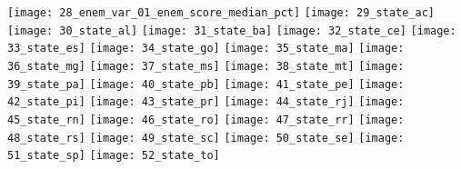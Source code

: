 \texttt{[image: 28\_enem\_var\_01\_enem\_score\_median\_pct]}
\texttt{[image: 29\_state\_ac]}
\texttt{[image: 30\_state\_al]}
\texttt{[image: 31\_state\_ba]}
\texttt{[image: 32\_state\_ce]}
\texttt{[image: 33\_state\_es]}
\texttt{[image: 34\_state\_go]}
\texttt{[image: 35\_state\_ma]}
\texttt{[image: 36\_state\_mg]}
\texttt{[image: 37\_state\_ms]}
\texttt{[image: 38\_state\_mt]}
\texttt{[image: 39\_state\_pa]}
\texttt{[image: 40\_state\_pb]}
\texttt{[image: 41\_state\_pe]}
\texttt{[image: 42\_state\_pi]}
\texttt{[image: 43\_state\_pr]}
\texttt{[image: 44\_state\_rj]}
\texttt{[image: 45\_state\_rn]}
\texttt{[image: 46\_state\_ro]}
\texttt{[image: 47\_state\_rr]}
\texttt{[image: 48\_state\_rs]}
\texttt{[image: 49\_state\_sc]}
\texttt{[image: 50\_state\_se]}
\texttt{[image: 51\_state\_sp]}
\texttt{[image: 52\_state\_to]}
